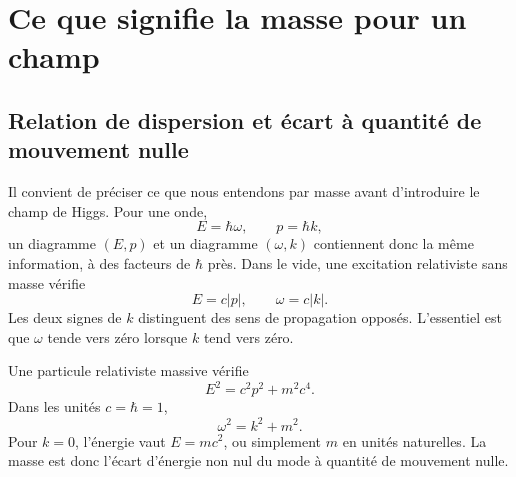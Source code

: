\section{Ce que signifie la masse pour un champ}

\subsection{Relation de dispersion et écart à quantité de mouvement nulle}

Il convient de préciser ce que nous entendons par masse avant d’introduire le champ de Higgs. Pour une onde,
\begin{equation}
  E=\hbar\omega,
  \qquad
  p=\hbar k,
  \label{eq:l08-quantum-wave}
\end{equation}
un diagramme \((E,p)\) et un diagramme \((\omega,k)\) contiennent donc la même information, à des facteurs de \(\hbar\) près. Dans le vide, une excitation relativiste sans masse vérifie
\begin{equation}
  E=c|p|,
  \qquad
  \omega=c|k|.
  \label{eq:l08-massless-dispersion}
\end{equation}
Les deux signes de \(k\) distinguent des sens de propagation opposés. L’essentiel est que \(\omega\) tende vers zéro lorsque \(k\) tend vers zéro.

Une particule relativiste massive vérifie
\begin{equation}
  E^2=c^2p^2+m^2c^4.
  \label{eq:l08-massive-dispersion}
\end{equation}
Dans les unités \(c=\hbar=1\),
\begin{equation}
  \omega^2=k^2+m^2.
\end{equation}
Pour \(k=0\), l’énergie vaut \(E=mc^2\), ou simplement \(m\) en unités naturelles. La masse est donc l’écart d’énergie non nul du mode à quantité de mouvement nulle.

